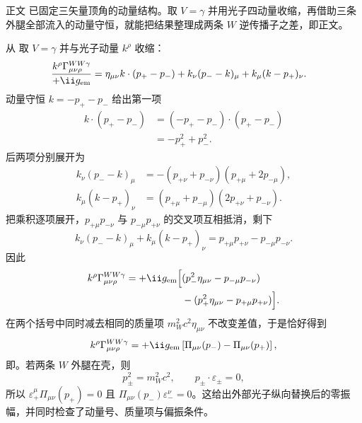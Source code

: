 \begin{derivation}
正文 已固定三矢量顶角的动量结构。取 $V=\gamma$ 并用光子四动量收缩，再借助三条外腿全部流入的动量守恒，就能把结果整理成两条 $W$ 逆传播子之差，即正文。

从 取 $V=\gamma$ 并与光子动量 $k^\rho$ 收缩：
\begin{align*}
 \frac{k^\rho\Gamma^{WW\gamma}_{\mu\nu\rho}}{+\ii g_{\rm em}}
 ={}&\eta_{\mu\nu}k\cdot(p_+-p_-)
 +k_\nu(p_--k)_\mu
 +k_\mu(k-p_+)_\nu.
\end{align*}
动量守恒 $k=-p_+-p_-$ 给出第一项
\begin{align*}
 k\cdot(p_+-p_-)
 &=(-p_+-p_-)\cdot(p_+-p_-)\\
 &=-p_+^2+p_-^2.
\end{align*}
后两项分别展开为
\begin{align*}
 k_\nu(p_--k)_\mu
 &=-(p_{+\nu}+p_{-\nu})(p_{+\mu}+2p_{-\mu}),\\
 k_\mu(k-p_+)_\nu
 &=(p_{+\mu}+p_{-\mu})(2p_{+\nu}+p_{-\nu}).
\end{align*}
把乘积逐项展开，$p_{+\mu}p_{-\nu}$ 与 $p_{-\mu}p_{+\nu}$ 的交叉项互相抵消，剩下
\begin{equation*}
 k_\nu(p_--k)_\mu+k_\mu(k-p_+)_\nu
 =p_{+\mu}p_{+\nu}-p_{-\mu}p_{-\nu}.
\end{equation*}
因此
\begin{align*}
 k^\rho\Gamma^{WW\gamma}_{\mu\nu\rho}
 =+\ii g_{\rm em}\Big[
 &(p_-^2\eta_{\mu\nu}-p_{-\mu}p_{-\nu})\\
 &-(p_+^2\eta_{\mu\nu}-p_{+\mu}p_{+\nu})
 \Big].
\end{align*}
在两个括号中同时减去相同的质量项 $m_W^2c^2\eta_{\mu\nu}$ 不改变差值，于是恰好得到
\begin{equation*}
 k^\rho\Gamma^{WW\gamma}_{\mu\nu\rho}
 =+\ii g_{\rm em}
 \left[\Pi_{\mu\nu}(p_-)-\Pi_{\mu\nu}(p_+)\right],
\end{equation*}
即。若两条 $W$ 外腿在壳，则
\begin{equation*}
 p_\pm^2=m_W^2c^2,
 \qquad
 p_\pm\cdot\varepsilon_\pm=0,
\end{equation*}
所以 $\varepsilon_+^\mu\Pi_{\mu\nu}(p_+)=0$ 且 $\Pi_{\mu\nu}(p_-)\varepsilon_-^\nu=0$。这给出外部光子纵向替换后的零振幅，并同时检查了动量号、质量项与偏振条件。
\end{derivation}

